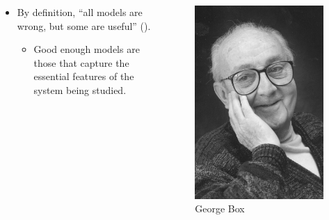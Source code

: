 \documentclass[
  ignorenonframetext,
]{beamer}
\providecommand{\tightlist}{%
  \setlength{\itemsep}{0pt}\setlength{\parskip}{0pt}}\usepackage{longtable,booktabs,array}
\begin{document}
\begin{frame}
\begin{columns}[T]
\begin{column}{0.6\textwidth}
\begin{itemize}
\tightlist
\item
  By definition, {``all models are wrong, but some are useful''}
  ().

  \begin{itemize}
  \tightlist
  \item
    Good enough models are those that capture the {essential features}
    of the system being studied.
  \end{itemize}
\end{itemize}
\end{column}

\begin{column}{0.4\textwidth}
\begin{figure}[H]

{\centering \includegraphics{images/GeorgeEPBox.jpeg}

}

\caption{George Box}

\end{figure}%
\end{column}
\end{columns}
\end{frame}
\end{document}
